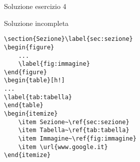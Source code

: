 \begin{frame}[fragile]{Soluzione esercizio 4}

\begin{block}{Soluzione incompleta}
\begin{lstlisting}
\section{Sezione}\label{sec:sezione}
\begin{figure}
	...
	\label{fig:immagine}
\end{figure}
\begin{table}[h!]
...
\label{tab:tabella}
\end{table}
\begin{itemize}
	\item Sezione~\ref{sec:sezione}
	\item Tabella~\ref{tab:tabella}
	\item Immagine~\ref{fig:immagine}
	\item \url{www.google.it}
\end{itemize}
\end{lstlisting}
\end{block}

\end{frame}